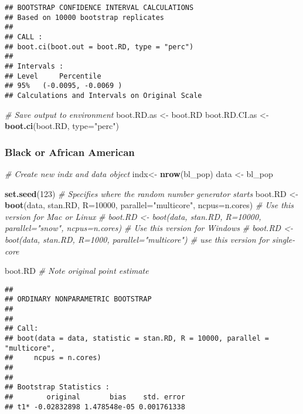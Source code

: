 \documentclass[
]{article}
\newenvironment{Shaded}{\begin{snugshade}}{\end{snugshade}}
\newcommand{\AttributeTok}[1]{\textcolor[rgb]{0.13,0.29,0.53}{#1}}
\newcommand{\CommentTok}[1]{\textcolor[rgb]{0.56,0.35,0.01}{\textit{#1}}}
\newcommand{\DecValTok}[1]{\textcolor[rgb]{0.00,0.00,0.81}{#1}}
\newcommand{\FunctionTok}[1]{\textcolor[rgb]{0.13,0.29,0.53}{\textbf{#1}}}
\newcommand{\NormalTok}[1]{#1}
\newcommand{\OtherTok}[1]{\textcolor[rgb]{0.56,0.35,0.01}{#1}}
\newcommand{\StringTok}[1]{\textcolor[rgb]{0.31,0.60,0.02}{#1}}
\begin{document}
\begin{verbatim}
## BOOTSTRAP CONFIDENCE INTERVAL CALCULATIONS
## Based on 10000 bootstrap replicates
## 
## CALL : 
## boot.ci(boot.out = boot.RD, type = "perc")
## 
## Intervals : 
## Level     Percentile     
## 95%   (-0.0095, -0.0069 )  
## Calculations and Intervals on Original Scale
\end{verbatim}

\begin{Shaded}
\begin{Highlighting}[]
\CommentTok{\# Save output to environment}
\NormalTok{boot.RD.as }\OtherTok{\textless{}{-}}\NormalTok{ boot.RD}
\NormalTok{boot.RD.CI.as }\OtherTok{\textless{}{-}} \FunctionTok{boot.ci}\NormalTok{(boot.RD, }\AttributeTok{type=}\StringTok{"perc"}\NormalTok{) }
\end{Highlighting}
\end{Shaded}

\subsubsection{Black or African
American}\label{black-or-african-american}

\begin{Shaded}
\begin{Highlighting}[]
\CommentTok{\# Create new indx and data object }
\NormalTok{indx}\OtherTok{\textless{}{-}} \FunctionTok{nrow}\NormalTok{(bl\_pop)}
\NormalTok{data }\OtherTok{\textless{}{-}}\NormalTok{ bl\_pop}

\FunctionTok{set.seed}\NormalTok{(}\DecValTok{123}\NormalTok{) }\CommentTok{\# Specifies where the random number generator starts}
\NormalTok{boot.RD }\OtherTok{\textless{}{-}} \FunctionTok{boot}\NormalTok{(data, stan.RD, }\AttributeTok{R=}\DecValTok{10000}\NormalTok{, }\AttributeTok{parallel=}\StringTok{"multicore"}\NormalTok{, }\AttributeTok{ncpus=}\NormalTok{n.cores) }\CommentTok{\# Use this version for Mac or Linux}
\CommentTok{\# boot.RD \textless{}{-} boot(data, stan.RD, R=10000, parallel="snow", ncpus=n.cores) \# Use this version for Windows}
\CommentTok{\# boot.RD \textless{}{-} boot(data, stan.RD, R=1000, parallel="multicore") \# use this version for single{-}core}

\NormalTok{boot.RD }\CommentTok{\# Note original point estimate}
\end{Highlighting}
\end{Shaded}

\begin{verbatim}
## 
## ORDINARY NONPARAMETRIC BOOTSTRAP
## 
## 
## Call:
## boot(data = data, statistic = stan.RD, R = 10000, parallel = "multicore", 
##     ncpus = n.cores)
## 
## 
## Bootstrap Statistics :
##        original       bias    std. error
## t1* -0.02832898 1.478548e-05 0.001761338
\end{verbatim}
\end{document}
